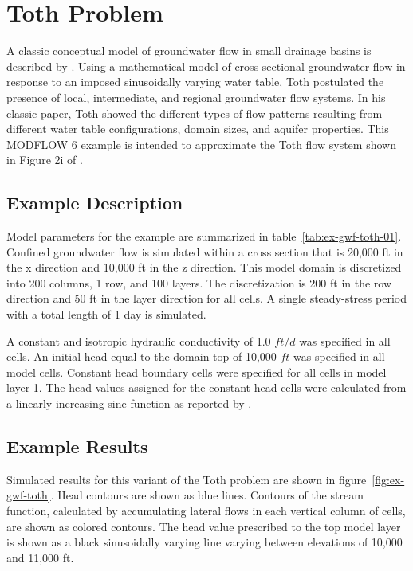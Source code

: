 \section{Toth Problem}

A classic conceptual model of groundwater flow in small drainage basins is described by \cite{toth1963}.  Using a mathematical model of cross-sectional groundwater flow in response to an imposed sinusoidally varying water table, Toth postulated the presence of local, intermediate, and regional groundwater flow systems.  In his classic paper, Toth showed the different types of flow patterns resulting from different water table configurations, domain sizes, and aquifer properties.  This MODFLOW 6 example is intended to approximate the Toth flow system shown in Figure 2i of \cite{toth1963}.

\subsection{Example Description}
Model parameters for the example are summarized in table~\ref{tab:ex-gwf-toth-01}. Confined groundwater flow is simulated within a cross section that is 20,000 ft in the x direction and 10,000 ft in the z direction.  This model domain is discretized into 200 columns, 1 row, and 100 layers. The discretization is 200 ft in the row direction and 50 ft in the layer direction for all cells. A single steady-stress period with a total length of 1 day is simulated.



A constant and isotropic hydraulic conductivity of 1.0 $ft/d$ was specified in all cells. An initial head equal to the domain top of 10,000 $ft$ was specified in all model cells. Constant head boundary cells were specified for all cells in model layer 1. The head values assigned for the constant-head cells were calculated from a linearly increasing sine function as reported by \cite{toth1963}.

\subsection{Example Results}

Simulated results for this variant of the Toth problem are shown in figure~\ref{fig:ex-gwf-toth}.  Head contours are shown as blue lines.  Contours of the stream function, calculated by accumulating lateral flows in each vertical column of cells, are shown as colored contours.  The head value prescribed to the top model layer is shown as a black sinusoidally varying line varying between elevations of 10,000 and 11,000 ft.

